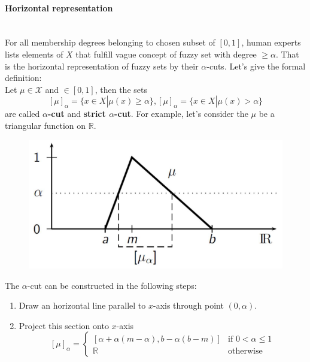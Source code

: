 \documentclass{article}
\begin{document}
\paragraph{Horizontal representation}\mbox{}\\
For all membership degrees belonging to chosen subset of $[0,1]$, human experts lists elements
of $X$ that fulfill vague concept of fuzzy set with degree $\geq\alpha$.
\newline\newline
That is the horizontal representation of fuzzy sets by their $\alpha$-cuts. Let's give the
formal definition:\newline\\ Let $\mu\in\mathcal{X}$ and $\in[0,1]$, then the sets
$$[\mu]_\alpha =\{x\in X|\mu(x) \geq\alpha\},[\mu]_\alpha=\{x\in X|\mu(x)>\alpha\}$$
are called \textbf{$\alpha$-cut} and \textbf{strict $\alpha$-cut}.
\newline\newline
For example, let's consider the $\mu$ be a triangular function on $\mathbb{R}$.
\begin{figure}[H]
    \centering
    \includegraphics[scale=0.5]{images/triangular-horiz-repr.png}
\end{figure}
The $\alpha$-cut can be constructed in the following steps:
\begin{enumerate}
    \item Draw an horizontal line parallel to $x$-axis through point $(0,\alpha)$.
    \item Project this section onto $x$-axis
          \[
              [\mu]_\alpha =
              \begin{cases}
                  [\alpha + \alpha (m-\alpha),b-\alpha(b-m)] & \text{if } 0<\alpha\leq 1 \\
                  \mathbb{R}                                 & \text{otherwise}
              \end{cases}
          \]
\end{enumerate}
\end{document}

